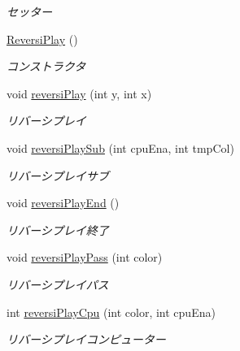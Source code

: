 \begin{DoxyCompactItemize}
\begin{DoxyCompactList}\small\item\em セッター \end{DoxyCompactList}\item 
\hyperlink{classjp_1_1gr_1_1java__conf_1_1yuta__yoshinaga_1_1reversi_1_1model_1_1_reversi_play_a8244dde6e8abc75432834de7ccb4f52c}{Reversi\+Play} ()
\begin{DoxyCompactList}\small\item\em コンストラクタ \end{DoxyCompactList}\item 
void \hyperlink{classjp_1_1gr_1_1java__conf_1_1yuta__yoshinaga_1_1reversi_1_1model_1_1_reversi_play_ac2fb56755f7f7d7ab0675035e8581ab1}{reversi\+Play} (int y, int x)
\begin{DoxyCompactList}\small\item\em リバーシプレイ \end{DoxyCompactList}\item 
void \hyperlink{classjp_1_1gr_1_1java__conf_1_1yuta__yoshinaga_1_1reversi_1_1model_1_1_reversi_play_a6ea2a343ad2fb3ef1317570e87c3fc4f}{reversi\+Play\+Sub} (int cpu\+Ena, int tmp\+Col)
\begin{DoxyCompactList}\small\item\em リバーシプレイサブ \end{DoxyCompactList}\item 
void \hyperlink{classjp_1_1gr_1_1java__conf_1_1yuta__yoshinaga_1_1reversi_1_1model_1_1_reversi_play_abd208c350d3713ef6872faaa813ac8c3}{reversi\+Play\+End} ()
\begin{DoxyCompactList}\small\item\em リバーシプレイ終了 \end{DoxyCompactList}\item 
void \hyperlink{classjp_1_1gr_1_1java__conf_1_1yuta__yoshinaga_1_1reversi_1_1model_1_1_reversi_play_acf3c99fcbff26d65f7b12f99d69ab88d}{reversi\+Play\+Pass} (int color)
\begin{DoxyCompactList}\small\item\em リバーシプレイパス \end{DoxyCompactList}\item 
int \hyperlink{classjp_1_1gr_1_1java__conf_1_1yuta__yoshinaga_1_1reversi_1_1model_1_1_reversi_play_a1b1b5c91163c374bc2e0bf23ff922617}{reversi\+Play\+Cpu} (int color, int cpu\+Ena)
\begin{DoxyCompactList}\small\item\em リバーシプレイコンピューター \end{DoxyCompactList}\item 

\end{DoxyCompactItemize}
